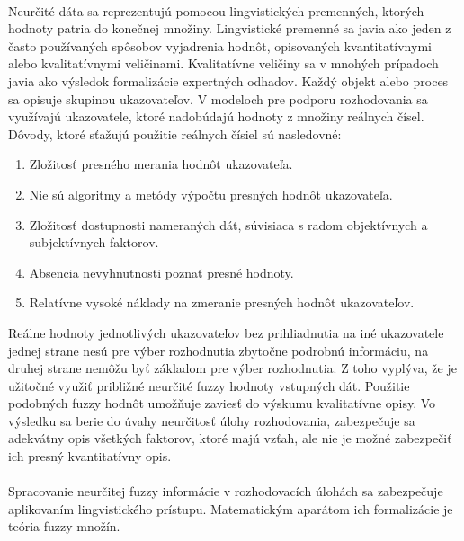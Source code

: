 \paragraph{}
Neurčité dáta sa reprezentujú pomocou lingvistických premenných, ktorých hodnoty patria do konečnej množiny. \cite{levashenkoProj}
Lingvistické premenné sa javia ako jeden z často používaných spôsobov vyjadrenia hodnôt, opisovaných kvantitatívnymi 
alebo kvalitatívnymi veličinami. Kvalitatívne veličiny sa v mnohých prípadoch javia ako výsledok formalizácie expertných odhadov. \cite{levashenkoProj}
Každý objekt alebo proces sa opisuje skupinou ukazovateľov. V modeloch pre podporu rozhodovania sa využívajú ukazovatele, ktoré nadobúdajú hodnoty z množiny reálnych čísel. 
Dôvody, ktoré sťažujú použitie reálnych čísiel sú nasledovné: \cite{levashenkoProj}
\begin{enumerate}
	\item Zložitosť presného merania hodnôt ukazovateľa. 
	\item Nie sú algoritmy a metódy výpočtu presných hodnôt ukazovateľa. 
	\item Zložitosť dostupnosti nameraných dát, súvisiaca s radom objektívnych a subjektívnych faktorov. 
	\item Absencia nevyhnutnosti poznať presné hodnoty. 
	\item Relatívne vysoké náklady na zmeranie presných hodnôt ukazovateľov. 
\end{enumerate}
Reálne hodnoty jednotlivých ukazovateľov bez prihliadnutia na iné ukazovatele jednej strane nesú pre výber rozhodnutia zbytočne podrobnú informáciu, na druhej strane nemôžu byť základom pre výber rozhodnutia. \cite{levashenkoProj}
Z toho vyplýva, že je užitočné využiť približné neurčité fuzzy hodnoty vstupných dát. 
Použitie podobných fuzzy hodnôt umožňuje zaviesť do výskumu kvalitatívne opisy. Vo výsledku sa berie do úvahy neurčitosť úlohy rozhodovania, zabezpečuje sa adekvátny opis všetkých faktorov, ktoré majú vzťah, ale nie je možné zabezpečiť ich presný kvantitatívny opis. 
\paragraph*{}
Spracovanie neurčitej fuzzy informácie v rozhodovacích úlohách sa zabezpečuje aplikovaním lingvistického prístupu.\cite{levashenkoProj} %
Matematickým aparátom ich formalizácie je teória fuzzy množín. 


